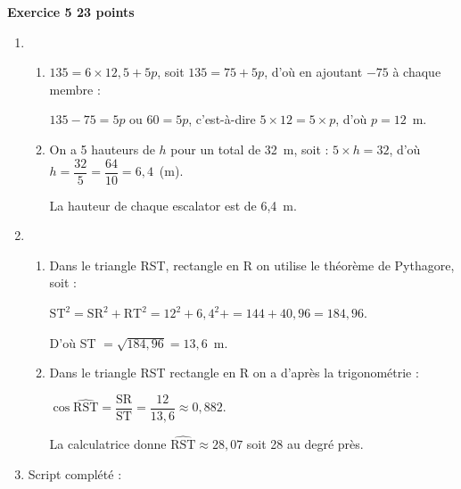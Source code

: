 \textbf{\large Exercice 5 \hfill 23 points}

\medskip

\begin{enumerate}
\item 
	\begin{enumerate}
		\item $135 = 6 \times 12,5 + 5p$, soit  $135 = 75 + 5p$, d'où en ajoutant $- 75$ à chaque membre :
		
	
$135 - 75 = 5p$ ou $60 = 5p$, c'est-à-dire $5 \times 12 = 5 \times p$, d'où $p = 12$~m.
		\item On a  5 hauteurs de $h$ pour un total de 32~m, soit : $5 \times h = 32$, d'où $h = \dfrac{32}{5} = \dfrac{64}{10} = 6,4$~(m).
		
La hauteur de chaque escalator est de 6,4~m.
	\end{enumerate}
\item 
	\begin{enumerate}
		\item Dans le triangle RST, rectangle en R on utilise le théorème de Pythagore, soit :
		
$\text{ST}^2= \text{SR}^2 + \text{RT}^2 = 12^2 +  6,4^2+  = 144 + 40,96  
=184,96$.

 D'où ST $=\sqrt{184,96} = 13,6$~m.
		\item Dans le triangle RST rectangle en R on a d'après la
trigonométrie :

$\cos \widehat{\text{RST}} = \dfrac{\text{SR}}{\text{ST}} = \dfrac{12}{13,6} \approx 0,882$.

La calculatrice donne $\widehat{\text{RST}} \approx 28,07$ soit 28\degres{} au degré près.
	\end{enumerate}
\item Script complété :

\begin{center}
\begin{scratch}[scale=1.75, num blocks]
{
}
\end{scratch}
\end{center}

\end{enumerate}



